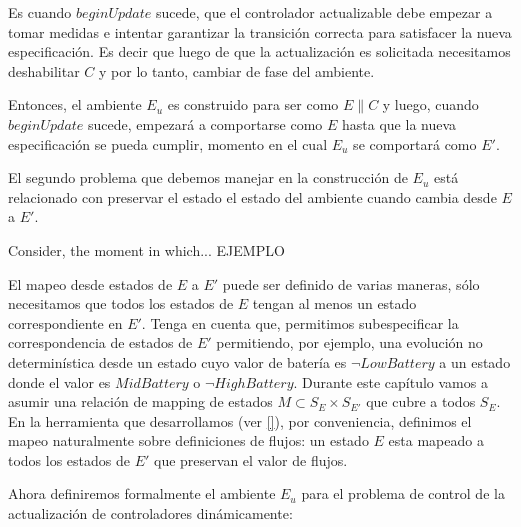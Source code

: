 Es cuando $beginUpdate$ sucede, que el controlador actualizable debe empezar a tomar medidas e intentar garantizar
la transición correcta para satisfacer la nueva especificación. Es decir que luego de que la actualización es
solicitada necesitamos deshabilitar $C$ y por lo tanto, cambiar de fase del ambiente.

Entonces, el ambiente $E_u$ es construido para ser como $E\|C$ y luego, cuando $beginUpdate$ sucede, empezará a
comportarse como $E$ hasta que la nueva especificación se pueda cumplir, momento en el cual $E_u$ se comportará como
$E'$.

El segundo problema que debemos manejar en la construcción de $E_u$ está relacionado con preservar el estado el estado
del ambiente cuando cambia desde $E$ a $E'$.

Consider, the moment in which... EJEMPLO

El mapeo desde estados de $E$ a $E'$ puede ser definido de varias maneras, sólo necesitamos que todos los estados de $E$
tengan al menos un estado correspondiente en $E'$. Tenga en cuenta que, permitimos subespecificar la correspondencia de
estados de $E'$ permitiendo, por ejemplo, una evolución no determinística desde un estado cuyo valor de batería es
$\lnot LowBattery$ a un estado donde el valor es $MidBattery$ o $\neg HighBattery$. Durante este capítulo vamos a asumir
una relación de mapping de estados $M \subset S_E \times S_{E'}$ que cubre a todos $S_E$. En la herramienta que desarrollamos (ver
\ref{}), por conveniencia, definimos el mapeo naturalmente sobre definiciones de flujos: un estado $E$ esta mapeado a
todos los estados de $E'$ que preservan el valor de flujos.

Ahora definiremos formalmente el ambiente $E_u$ para el problema de control de la actualización de controladores
dinámicamente:


